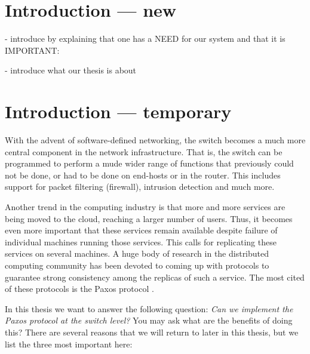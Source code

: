 \chapter{Introduction --- new}

- introduce by explaining that one has a NEED for our system and that it is
IMPORTANT:

- introduce what our thesis is about


\chapter{Introduction --- temporary}

With the advent of software-defined networking, the switch becomes a much
more central component in the network infrastructure.
%
That is, the switch can be programmed to perform a mude wider range of
functions that previously could not be done, or had to be done on end-hosts
or in the router.
%
This includes support for packet filtering (firewall), intrusion detection
and much more.


Another trend in the computing industry is that more and more services are
being moved to the cloud, reaching a larger number of users.
%
Thus, it becomes even more important that these services remain available
despite failure of individual machines running those services.
%
This calls for replicating these services on several machines.
%
A huge body of research in the distributed computing community has been
devoted to coming up with protocols to guarantee strong consistency among
the replicas of such a service.
%
The most cited of these protocols is the Paxos protocol \cite{Lam01}.
%

In this thesis we want to answer the following question: \textit{Can we
implement the Paxos protocol at the switch level?}
%
You may ask what are the benefits of doing this?
%
There are several reasons that we will return to later in this thesis, but
we list the three most important here:

